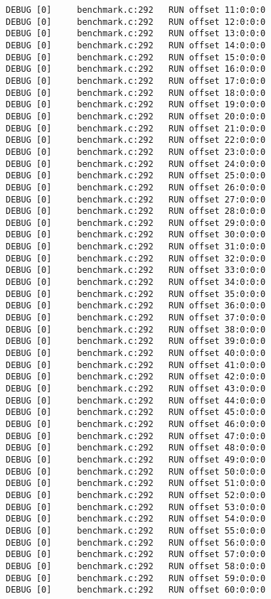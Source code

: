 \begin{verbatim}
DEBUG [0]     benchmark.c:292   RUN offset 11:0:0:0
DEBUG [0]     benchmark.c:292   RUN offset 12:0:0:0
DEBUG [0]     benchmark.c:292   RUN offset 13:0:0:0
DEBUG [0]     benchmark.c:292   RUN offset 14:0:0:0
DEBUG [0]     benchmark.c:292   RUN offset 15:0:0:0
DEBUG [0]     benchmark.c:292   RUN offset 16:0:0:0
DEBUG [0]     benchmark.c:292   RUN offset 17:0:0:0
DEBUG [0]     benchmark.c:292   RUN offset 18:0:0:0
DEBUG [0]     benchmark.c:292   RUN offset 19:0:0:0
DEBUG [0]     benchmark.c:292   RUN offset 20:0:0:0
DEBUG [0]     benchmark.c:292   RUN offset 21:0:0:0
DEBUG [0]     benchmark.c:292   RUN offset 22:0:0:0
DEBUG [0]     benchmark.c:292   RUN offset 23:0:0:0
DEBUG [0]     benchmark.c:292   RUN offset 24:0:0:0
DEBUG [0]     benchmark.c:292   RUN offset 25:0:0:0
DEBUG [0]     benchmark.c:292   RUN offset 26:0:0:0
DEBUG [0]     benchmark.c:292   RUN offset 27:0:0:0
DEBUG [0]     benchmark.c:292   RUN offset 28:0:0:0
DEBUG [0]     benchmark.c:292   RUN offset 29:0:0:0
DEBUG [0]     benchmark.c:292   RUN offset 30:0:0:0
DEBUG [0]     benchmark.c:292   RUN offset 31:0:0:0
DEBUG [0]     benchmark.c:292   RUN offset 32:0:0:0
DEBUG [0]     benchmark.c:292   RUN offset 33:0:0:0
DEBUG [0]     benchmark.c:292   RUN offset 34:0:0:0
DEBUG [0]     benchmark.c:292   RUN offset 35:0:0:0
DEBUG [0]     benchmark.c:292   RUN offset 36:0:0:0
DEBUG [0]     benchmark.c:292   RUN offset 37:0:0:0
DEBUG [0]     benchmark.c:292   RUN offset 38:0:0:0
DEBUG [0]     benchmark.c:292   RUN offset 39:0:0:0
DEBUG [0]     benchmark.c:292   RUN offset 40:0:0:0
DEBUG [0]     benchmark.c:292   RUN offset 41:0:0:0
DEBUG [0]     benchmark.c:292   RUN offset 42:0:0:0
DEBUG [0]     benchmark.c:292   RUN offset 43:0:0:0
DEBUG [0]     benchmark.c:292   RUN offset 44:0:0:0
DEBUG [0]     benchmark.c:292   RUN offset 45:0:0:0
DEBUG [0]     benchmark.c:292   RUN offset 46:0:0:0
DEBUG [0]     benchmark.c:292   RUN offset 47:0:0:0
DEBUG [0]     benchmark.c:292   RUN offset 48:0:0:0
DEBUG [0]     benchmark.c:292   RUN offset 49:0:0:0
DEBUG [0]     benchmark.c:292   RUN offset 50:0:0:0
DEBUG [0]     benchmark.c:292   RUN offset 51:0:0:0
DEBUG [0]     benchmark.c:292   RUN offset 52:0:0:0
DEBUG [0]     benchmark.c:292   RUN offset 53:0:0:0
DEBUG [0]     benchmark.c:292   RUN offset 54:0:0:0
DEBUG [0]     benchmark.c:292   RUN offset 55:0:0:0
DEBUG [0]     benchmark.c:292   RUN offset 56:0:0:0
DEBUG [0]     benchmark.c:292   RUN offset 57:0:0:0
DEBUG [0]     benchmark.c:292   RUN offset 58:0:0:0
DEBUG [0]     benchmark.c:292   RUN offset 59:0:0:0
DEBUG [0]     benchmark.c:292   RUN offset 60:0:0:0

\end{verbatim}
